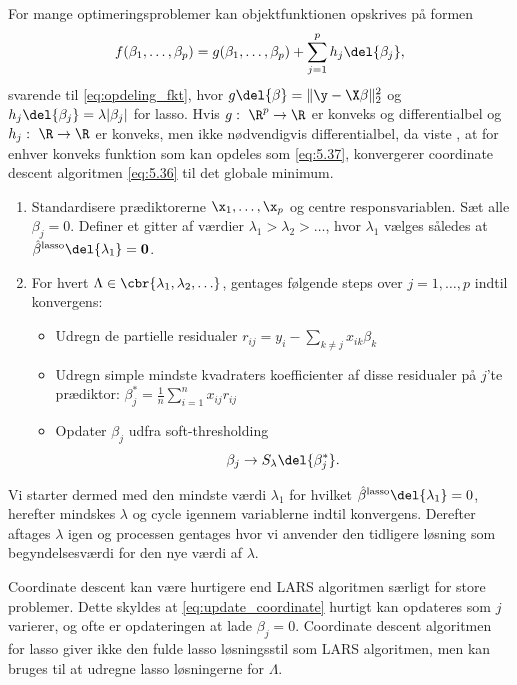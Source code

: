 For mange optimeringsproblemer kan objektfunktionen opskrives på formen
\begin{align}
f(\beta_1, \dots, \beta_p) = g(\beta_1, \dots, \beta_p) + \sum_{j = 1}^p h_j \del{\beta_j}, \label{eq:5.37}
\end{align}
svarende til \eqref{eq:opdeling_fkt}, hvor \(g \del{\beta} =\Vert \y - \X \beta \Vert_2^2\) og \(h_j \del{\beta_j} = \lambda \vert \beta_j \vert\) for lasso.
Hvis \(g: \ \R^p \rightarrow \R\) er konveks og differentialbel og $h_j: \ \R \rightarrow \R$ er konveks, men ikke nødvendigvis differentialbel, da viste \citep{Tseng_coordinate}, at for enhver konveks funktion som kan opdeles som \eqref{eq:5.37}, konvergerer coordinate descent algoritmen \eqref{eq:5.36} til det globale minimum. 
%
\begin{alg} 
\begin{enumerate}
\item Standardisere prædiktorerne \(\x_1, \ldots, \x_p\) og centre responsvariablen.
Sæt alle \(\beta_j = 0\).
Definer et gitter af værdier \(\lambda_1 > \lambda_2 > \ldots\), hvor \(\lambda_1\) vælges således at \(\hat{\beta}^\text{lasso} \del{\lambda_1} =\mathbf{0}\).
\item For hvert \(\Lambda \in \cbr{\lambda_1, \lambda_2, \ldots}\), gentages følgende steps over \(j = 1, \ldots, p\) indtil konvergens:
\begin{itemize}
\item Udregn de partielle residualer \(r_{ij} = y_i - \sum_{k \neq j} x_{ik} \beta_k\)
\item Udregn simple mindste kvadraters koefficienter af disse residualer på \(j\)'te prædiktor: \(\beta_j^* = \frac{1}{n} \sum_{i=1}^n x_{ij} r_{ij}\) 
\item Opdater \(\beta_j\) udfra soft-thresholding
\begin{align}
\beta_j \rightarrow S_\lambda \del{\beta_j^*}. \label{eq:update_coordinate}
\end{align}
\end{itemize}
\end{enumerate}
\end{alg}
%
Vi starter dermed med den mindste værdi \(\lambda_1\) for hvilket \(\hat{\beta}^\text{lasso} \del{\lambda_1} = 0\), herefter mindskes \(\lambda\) og cycle igennem variablerne indtil konvergens.
Derefter aftages \(\lambda\) igen og processen gentages hvor vi anvender den tidligere løsning som begyndelsesværdi for den nye værdi af \(\lambda\).

Coordinate descent kan være hurtigere end LARS algoritmen særligt for store problemer.
Dette skyldes at \eqref{eq:update_coordinate} hurtigt kan opdateres som \(j\) varierer, og ofte er opdateringen at lade \(\beta_j = 0\).
Coordinate descent algoritmen for lasso giver ikke den fulde lasso løsningsstil som LARS algoritmen, men kan bruges til at udregne lasso løsningerne for \(\Lambda\).

\newpage
